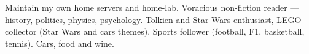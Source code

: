 
\begin{cvskills}

        \cvskill
        {}
        {Maintain my own home servers and home-lab.
        Voracious non-fiction reader — history, politics, physics, psychology. Tolkien and Star Wars enthusiast, LEGO collector (Star Wars and cars themes).
        Sports follower (football, F1, basketball, tennis). Cars, food and wine.
        }

\end{cvskills}
